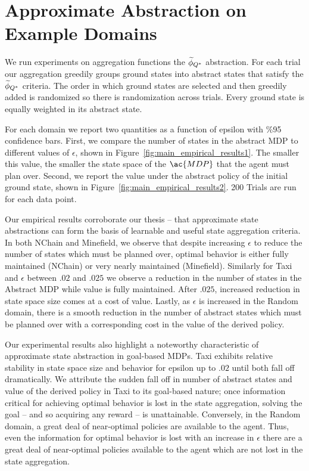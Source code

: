 \section{Approximate Abstraction on Example Domains}
We run experiments on aggregation functions the $\widetilde \phi_{Q^*}$ abstraction. For each trial our aggregation greedily groups ground states into abstract states that satisfy the $\widetilde \phi_{Q^*}$ criteria. The order in which ground states are selected and then greedily added is randomized so there is randomization across trials. Every ground state is equally weighted in its abstract state.

For each domain we report two quantities as a function of epsilon with \%95 confidence bars. First, we compare the number of states in the abstract \ac{MDP} to different values of $\epsilon$, shown in Figure~\ref{fig:main_empirical_results1}. The smaller this value, the smaller the state space of the $\ac{MDP}$ that the agent must plan over. Second, we report the value under the abstract policy of the initial ground state, shown in Figure~\ref{fig:main_empirical_results2}. 200 Trials are run for each data point.

Our empirical results corroborate our thesis -- that approximate state abstractions can form the basis of learnable and useful state aggregation criteria. In both NChain and Minefield, we observe that despite increasing $\epsilon$ to reduce the number of states which must be planned over, optimal behavior is either fully maintained (NChain) or very nearly maintained (Minefield). Similarly for Taxi and $\epsilon$ between $.02$ and $.025$ we observe a reduction in the number of states in the Abstract MDP while value is fully maintained. After $.025$, increased reduction in state space size comes at a cost of value. Lastly, as $\epsilon$ is increased in the Random domain, there is a smooth reduction in the number of abstract states which must be planned over with a corresponding cost in the value of the derived policy.

Our experimental results also highlight a noteworthy characteristic of approximate state abstraction in goal-based \acp{MDP}. Taxi exhibits relative stability in state space size and behavior for epsilon up to $.02$ until both fall off dramatically. We attribute the sudden fall off in number of abstract states and value of the derived policy in Taxi to its goal-based nature; once information critical for achieving optimal behavior is lost in the state aggregation, solving the goal -- and so acquiring any reward -- is unattainable. Conversely, in the Random domain, a great deal of near-optimal policies are available to the agent. Thus, even the information for optimal behavior is lost with an increase in $\epsilon$ there are a great deal of near-optimal policies available to the agent which are not lost in the state aggregation.

